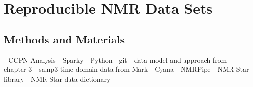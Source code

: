 \chapter{Reproducible NMR Data Sets}

\section{Methods and Materials}
 - CCPN Analysis
 - Sparky
 - Python
 - git
 - data model and approach from chapter 3
 - samp3 time-domain data from Mark
 - Cyana
 - NMRPipe
 - NMR-Star library
 - NMR-Star data dictionary

